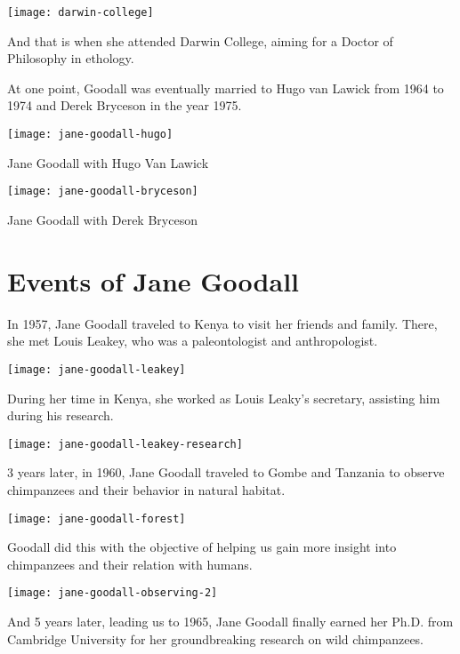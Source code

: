 \documentclass[12pt]{report}
\begin{document}
\texttt{[image: darwin-college]}

And that is when she attended Darwin College, aiming for a Doctor of Philosophy
in ethology.

\pagebreak

At one point, Goodall was eventually married to Hugo van Lawick from 1964 to
1974 and Derek Bryceson in the year 1975.

\texttt{[image: jane-goodall-hugo]}

Jane Goodall with Hugo Van Lawick

\texttt{[image: jane-goodall-bryceson]}

Jane Goodall with Derek Bryceson

\section*{Events of Jane Goodall}

In 1957, Jane Goodall traveled to Kenya to visit her friends and family. There,
she met Louis Leakey, who was a paleontologist and anthropologist.

\texttt{[image: jane-goodall-leakey]}

During her time in Kenya, she worked as Louis Leaky’s secretary, assisting him
during his research.

\texttt{[image: jane-goodall-leakey-research]}

\pagebreak

3 years later, in 1960, Jane Goodall traveled to Gombe and Tanzania to observe
chimpanzees and their behavior in natural habitat.

\texttt{[image: jane-goodall-forest]}

Goodall did this with the objective of helping us gain more insight into
chimpanzees and their relation with humans.

\texttt{[image: jane-goodall-observing-2]}

\pagebreak

And 5 years later, leading us to 1965, Jane Goodall finally earned her Ph.D.
from Cambridge University for her groundbreaking research on wild chimpanzees.
\end{document}
